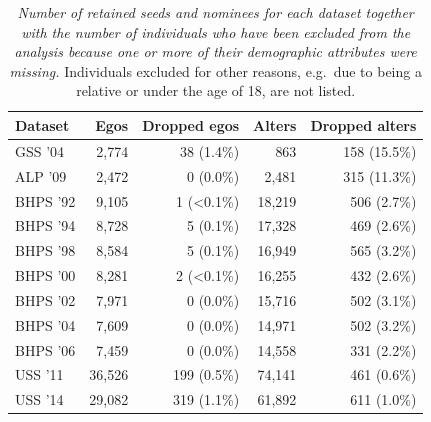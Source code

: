 \documentclass{scrartcl}
\newcommand{\titlecaption}[2]{\caption[#1]{\emph{#1} #2}}
\begin{document}
\begin{table}
    \begin{tabularx}{\columnwidth}{lrrrr}
        \toprule %
        Dataset & Egos & Dropped egos & Alters & Dropped alters \\
        \midrule %
        GSS '04 & 2,774 & 38 (1.4\%) & 863 & 158 (15.5\%)\\
        ALP '09 & 2,472 & 0 (0.0\%) & 2,481 & 315 (11.3\%)\\
        BHPS '92 & 9,105 & 1 (\textless 0.1\%) & 18,219 & 506 (2.7\%)\\
        BHPS '94 & 8,728 & 5 (0.1\%) & 17,328 & 469 (2.6\%)\\
        BHPS '98 & 8,584 & 5 (0.1\%) & 16,949 & 565 (3.2\%)\\
        BHPS '00 & 8,281 & 2 (\textless 0.1\%) & 16,255 & 432 (2.6\%)\\
        BHPS '02 & 7,971 & 0 (0.0\%) & 15,716 & 502 (3.1\%)\\
        BHPS '04 & 7,609 & 0 (0.0\%) & 14,971 & 502 (3.2\%)\\
        BHPS '06 & 7,459 & 0 (0.0\%) & 14,558 & 331 (2.2\%)\\
        USS '11 & 36,526 & 199 (0.5\%) & 74,141 & 461 (0.6\%)\\
        USS '14 & 29,082 & 319 (1.1\%) & 61,892 & 611 (1.0\%)\\
        \bottomrule %
    \end{tabularx}
    \titlecaption{Number of retained seeds and nominees for each dataset together with the number of individuals who have been excluded from the analysis because one or more of their demographic attributes were missing.}{Individuals excluded for other reasons, e.g.\ due to being a relative or under the age of 18, are not listed.\label{tbl:survey-sample-size}}
\end{table}
\end{document}
